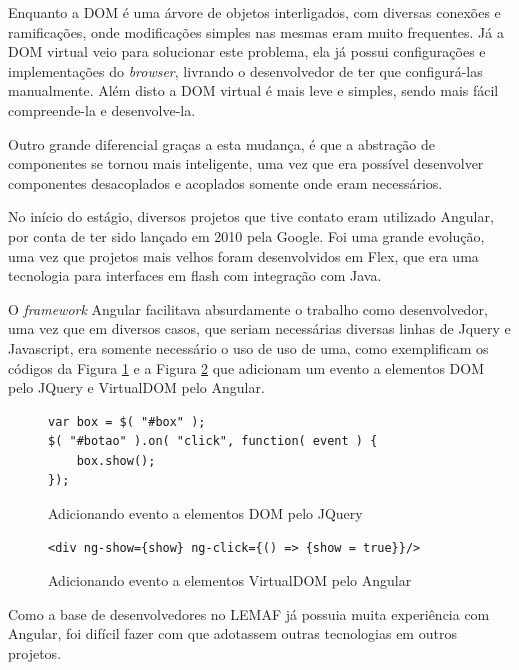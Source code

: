 Enquanto a DOM é uma árvore de objetos interligados, com diversas conexões e ramificações, onde modificações simples nas mesmas eram muito frequentes. Já a DOM virtual veio para 
solucionar este problema, ela já possui configurações e implementações do \textit{browser}, livrando o desenvolvedor de ter que configurá-las manualmente. Além disto a DOM virtual é mais leve e simples, sendo mais fácil compreende-la e desenvolve-la.

Outro grande diferencial graças a esta mudança, é que a abstração de componentes se tornou mais inteligente, uma vez que era possível desenvolver componentes desacoplados e acoplados somente onde eram necessários.

No início do estágio, diversos projetos que tive contato eram utilizado Angular, por conta de ter sido lançado em 2010 pela Google. Foi uma grande evolução, uma vez que projetos mais velhos foram desenvolvidos em Flex, que era uma tecnologia para interfaces em flash com integração com Java.

O \textit{framework} Angular facilitava absurdamente o trabalho como desenvolvedor, uma vez que em diversos casos, que seriam necessárias diversas linhas de Jquery e Javascript, era somente necessário o uso de uso de uma, como exemplificam os códigos da Figura \ref{fig:exemplocodigo1} e a Figura \ref{fig:exemplocodigo2} que adicionam um evento a elementos DOM pelo JQuery e VirtualDOM pelo Angular.


\begin{figure}[!htb]
\centering
\caption{Adicionando evento a elementos DOM pelo JQuery} %
\begin{lstlisting}
var box = $( "#box" );
$( "#botao" ).on( "click", function( event ) {
    box.show();
});
\end{lstlisting} 
\label{fig:exemplocodigo1} %
\end{figure}

\begin{figure}[!htb]
\centering
\caption{Adicionando evento a elementos VirtualDOM pelo Angular} %
\begin{lstlisting}
<div ng-show={show} ng-click={() => {show = true}}/>
\end{lstlisting} 
\label{fig:exemplocodigo2} %
\end{figure}
    

Como a base de desenvolvedores no LEMAF já possuia muita experiência com Angular, foi difícil fazer com que adotassem outras tecnologias em outros projetos.


